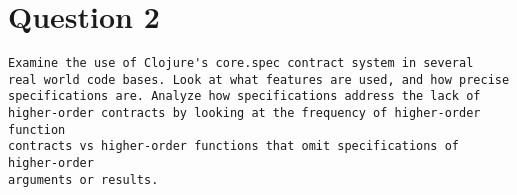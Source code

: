 \section{Question 2}

\begin{verbatim}
Examine the use of Clojure's core.spec contract system in several
real world code bases. Look at what features are used, and how precise
specifications are. Analyze how specifications address the lack of
higher-order contracts by looking at the frequency of higher-order function
contracts vs higher-order functions that omit specifications of higher-order
arguments or results.
\end{verbatim}










